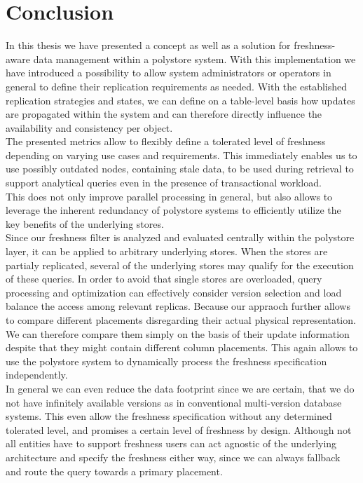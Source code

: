 \chapter{Conclusion}
\label{c:conclusion}

In this thesis we have presented a concept as well as a solution for freshness-aware data management within a polystore system.
With this implementation we have introduced a possibility to allow system administrators or operators in general to define their replication requirements as needed. 
With the established replication strategies and states, we can define on a table-level basis how updates are propagated within the system and can therefore directly influence 
the availability and consistency per object.\\
The presented metrics allow to flexibly define a tolerated level of freshness depending on varying use cases and requirements.
This immediately enables us to use possibly outdated nodes, containing stale data, to be used during retrieval to support analytical queries even in the presence of 
transactional workload.\\
This does not only improve parallel processing in general, but also allows to leverage the inherent redundancy of polystore systems
to efficiently utilize the key benefits of the underlying stores.\\




Since our freshness filter is analyzed and evaluated centrally within the polystore layer, it can be applied to arbitrary underlying stores.
When the stores are partialy replicated, several of the underlying stores may qualify for the execution of these queries. 
In order to avoid that single stores are overloaded, query processing and optimization
can effectively consider version selection and load balance the access among relevant replicas.
Because our appraoch further allows to compare different placements disregarding their actual physical representation. We can therefore compare them simply on the basis of their
update information despite that they might contain different column placements. 
This again allows to use the polystore system to dynamically process the freshness specification independently.\\
In general we can even reduce the data footprint since we are certain, that we do not have infinitely available versions as in conventional multi-version database systems.
This even allow the freshness specification without any determined tolerated level, and promises a certain level of freshness by design.
Although not all entities have to support freshness users can act agnostic of the underlying architecture and specify the freshness either way, 
since we can always fallback and route the query towards a primary placement.\\



